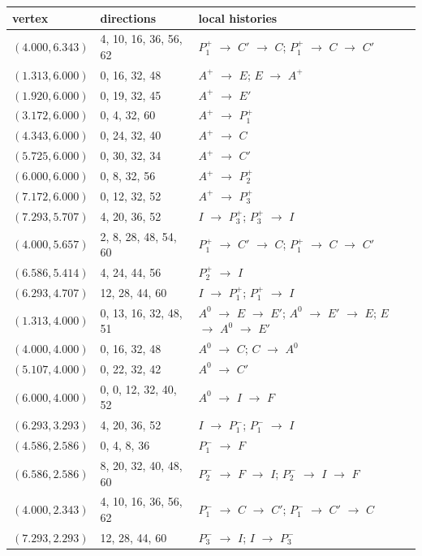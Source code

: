 \documentclass[11pt]{article}
\theoremstyle{definition}
\theoremstyle{remark}
\begin{document}
{\small
\begin{longtable}{l l l}
\toprule
vertex & directions & local histories\\
\midrule
\endhead
$(4.000, 6.343)$ & 4, 10, 16, 36, 56, 62 & $P_1^{+}$ $\to$ $C'$ $\to$ $C$; $P_1^{+}$ $\to$ $C$ $\to$ $C'$ \\
$(1.313, 6.000)$ & 0, 16, 32, 48 & $A^{+}$ $\to$ $E$; $E$ $\to$ $A^{+}$ \\
$(1.920, 6.000)$ & 0, 19, 32, 45 & $A^{+}$ $\to$ $E'$ \\
$(3.172, 6.000)$ & 0, 4, 32, 60 & $A^{+}$ $\to$ $P_1^{+}$ \\
$(4.343, 6.000)$ & 0, 24, 32, 40 & $A^{+}$ $\to$ $C$ \\
$(5.725, 6.000)$ & 0, 30, 32, 34 & $A^{+}$ $\to$ $C'$ \\
$(6.000, 6.000)$ & 0, 8, 32, 56 & $A^{+}$ $\to$ $P_2^{+}$ \\
$(7.172, 6.000)$ & 0, 12, 32, 52 & $A^{+}$ $\to$ $P_3^{+}$ \\
$(7.293, 5.707)$ & 4, 20, 36, 52 & $I$ $\to$ $P_3^{+}$; $P_3^{+}$ $\to$ $I$ \\
$(4.000, 5.657)$ & 2, 8, 28, 48, 54, 60 & $P_1^{+}$ $\to$ $C'$ $\to$ $C$; $P_1^{+}$ $\to$ $C$ $\to$ $C'$ \\
$(6.586, 5.414)$ & 4, 24, 44, 56 & $P_2^{+}$ $\to$ $I$ \\
$(6.293, 4.707)$ & 12, 28, 44, 60 & $I$ $\to$ $P_1^{+}$; $P_1^{+}$ $\to$ $I$ \\
$(1.313, 4.000)$ & 0, 13, 16, 32, 48, 51 & $A^{0}$ $\to$ $E$ $\to$ $E'$; $A^{0}$ $\to$ $E'$ $\to$ $E$; $E$ $\to$ $A^{0}$ $\to$ $E'$ \\
$(4.000, 4.000)$ & 0, 16, 32, 48 & $A^{0}$ $\to$ $C$; $C$ $\to$ $A^{0}$ \\
$(5.107, 4.000)$ & 0, 22, 32, 42 & $A^{0}$ $\to$ $C'$ \\
$(6.000, 4.000)$ & 0, 0, 12, 32, 40, 52 & $A^{0}$ $\to$ $I$ $\to$ $F$ \\
$(6.293, 3.293)$ & 4, 20, 36, 52 & $I$ $\to$ $P_1^{-}$; $P_1^{-}$ $\to$ $I$ \\
$(4.586, 2.586)$ & 0, 4, 8, 36 & $P_1^{-}$ $\to$ $F$ \\
$(6.586, 2.586)$ & 8, 20, 32, 40, 48, 60 & $P_2^{-}$ $\to$ $F$ $\to$ $I$; $P_2^{-}$ $\to$ $I$ $\to$ $F$ \\
$(4.000, 2.343)$ & 4, 10, 16, 36, 56, 62 & $P_1^{-}$ $\to$ $C$ $\to$ $C'$; $P_1^{-}$ $\to$ $C'$ $\to$ $C$ \\
$(7.293, 2.293)$ & 12, 28, 44, 60 & $P_3^{-}$ $\to$ $I$; $I$ $\to$ $P_3^{-}$ \\

\end{longtable}}
\end{document}
